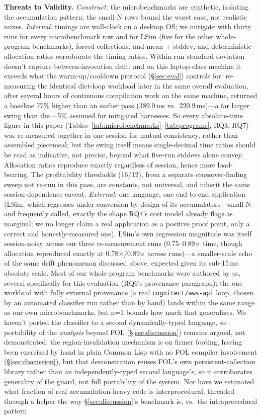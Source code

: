 \documentclass[sigplan,review,anonymous]{acmart}
\begin{document}
\textbf{Threats to Validity.} \emph{Construct:} the microbenchmarks are synthetic, isolating the accumulation pattern; the small-N rows bound the worst case, not realistic mixes. \emph{Internal:} timings are wall-clock on a desktop OS; we mitigate with thirty runs for every microbenchmark row and for LSim (five for the other whole-program benchmarks), forced collections, and mean $\pm$ stddev, and deterministic allocation ratios corroborate the timing ratios. Within-run standard deviation doesn't capture between-invocation drift, and on this laptop-class machine it exceeds what the warm-up/cooldown protocol (§\ref{sec:eval}) controls for: re-measuring the identical dict-loop workload later in the same overall evaluation, after several hours of continuous compilation work on the same machine, returned a baseline 77\% higher than an earlier pass ($389.0$\,ms vs.\ $220.9$\,ms)---a far larger swing than the $\sim$5\% assumed for mitigated harnesses. So every absolute-time figure in this paper (Tables~\ref{tab:microbenchmarks}--\ref{tab:programs}, RQ3, RQ7) was re-measured together in one session for mutual consistency, rather than assembled piecemeal; but the swing itself means single-decimal time ratios should be read as indicative, not precise, beyond what five-run stddevs alone convey. Allocation ratios reproduce exactly regardless of session, hence more load-bearing. The profitability thresholds (16/12), from a separate crossover-finding sweep not re-run in this pass, are constants, not universal, and inherit the same session-dependence caveat. \emph{External:} one language, one end-to-end application (LSim, which regresses under conversion by design of its accumulators---small-N and frequently called, exactly the shape RQ4's cost model already flags as marginal; we no longer claim a real application as a positive proof point, only a correct and honestly-measured one). LSim's own regression magnitude was itself session-noisy across our three re-measurement runs (0.75--0.89$\times$ time, though allocation reproduced exactly at 0.78$\times$/0.89$\times$ across runs)---a smaller-scale echo of the same drift phenomenon discussed above, expected given its sub-15\,ms absolute scale. Most of our whole-program benchmarks were authored by us, several specifically for this evaluation (RQ6's provenance paragraph); the one workload with fully external provenance (a real \texttt{cognitect/aws-api} loop, chosen by an automated classifier run rather than by hand) lands within the same range as our own microbenchmarks, but n=1 bounds how much that generalizes. We haven't ported the classifier to a second dynamically-typed language, so portability of the \emph{analysis} beyond FOL (§\ref{sec:discussion}) remains argued, not demonstrated; the region-invalidation mechanism is on firmer footing, having been exercised by hand in plain Common Lisp with no FOL compiler involvement (§\ref{sec:discussion}), but that demonstration reuses FOL's own persistent-collection library rather than an independently-typed second language's, so it corroborates generality of the guard, not full portability of the system. Nor have we estimated what fraction of real accumulation-heavy code is interprocedural, threaded through a helper the way §\ref{sec:discussion}'s benchmark is, vs.\ the intraprocedural pattern 
\end{document}
